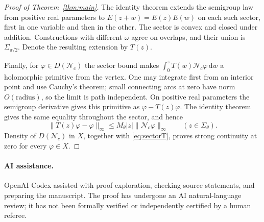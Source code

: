 \documentclass[11pt]{article}
\newcommand{\Nc}{\mathcal N_c}
\newcommand{\dd}{\,\mathrm d}
\newcommand{\norm}[1]{\lVert #1\rVert}
\newcommand{\abs}[1]{\lvert #1\rvert}
\begin{document}
\begin{proof}[Proof of Theorem~\ref{thm:main}]
The identity theorem extends the semigroup law from positive real parameters
to $E(z+w)=E(z)E(w)$ on each such sector, first in one variable and then in
the other. The sector is convex and closed under addition. Constructions
with different $\omega$ agree on overlaps, and their union is
$\Sigma_{\pi/2}$. Denote the resulting extension by $T(z)$.

Finally, for $\varphi\in D(\Nc)$ the sector bound makes
$\int_0^z T(w)\Nc\varphi\dd w$ a holomorphic primitive from the vertex.
One may integrate first from an interior point and use Cauchy's theorem;
small connecting arcs at zero have norm $O(\text{radius})$, so the limit is
path independent. On positive real parameters the semigroup derivative
gives this primitive as $\varphi-T(z)\varphi$. The identity theorem gives
the same equality throughout the sector, and hence
\[
 \norm{T(z)\varphi-\varphi}_\infty
    \leq M_\theta\abs z\norm{\Nc\varphi}_\infty
       \qquad(z\in\Sigma_\theta).
\]
Density of $D(\Nc)$ in $X$, together with \eqref{eq:sectorT}, proves strong
continuity at zero for every $\varphi\in X$.
\end{proof}

\paragraph{AI assistance.}
OpenAI Codex assisted with proof exploration, checking source statements,
and preparing the manuscript. The proof has undergone an AI natural-language
review; it has not been formally verified or independently certified by a
human referee.
\end{document}
